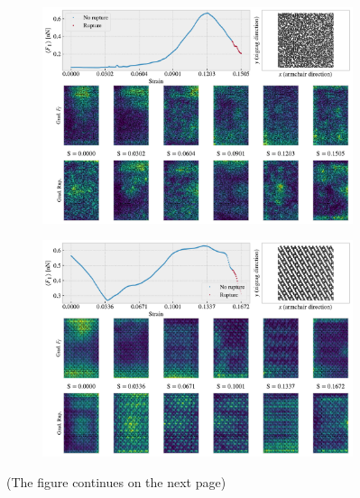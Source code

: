 \begin{figure}[!htb]
  \centering
  \begin{subfigure}[t]{1\textwidth}
      \centering
      \includegraphics[width=0.8\linewidth]{figures/search/grad_cam_GA_RN_start_top0.pdf}
      \caption{}
      \label{fig:GC_mixed_p}
  \end{subfigure}
  \hfill
  \vspace{1cm}
  \begin{subfigure}[t]{1\textwidth}
      \centering
      \includegraphics[width=0.8\linewidth]{figures/search/grad_cam_pop_1_7_1_1_4.pdf}
      \caption{}
      \label{fig:GC_pop_search}
  \end{subfigure}
  \hfill
  \caption{(The figure continues on the next page)}
\end{figure}

